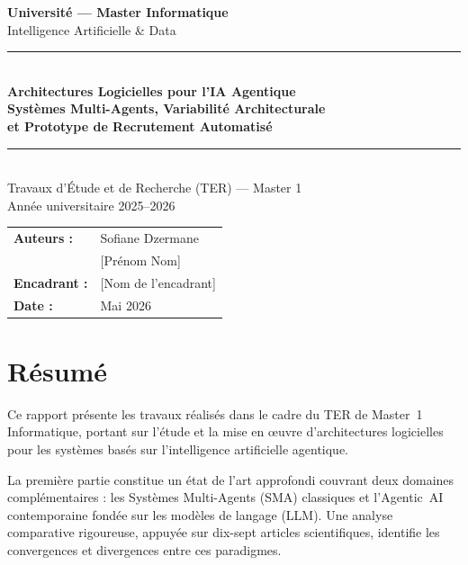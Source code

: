 \documentclass[12pt,a4paper]{report}
\begin{document}
\begin{titlepage}
\begin{center}
\vspace*{1cm}
{\Large\bfseries Université --- Master Informatique}\\[0.3em]
{\large Intelligence Artificielle \& Data}\\[0.5em]
\rule{\textwidth}{1.5pt}\\[1.5em]
{\LARGE\bfseries\color{primary}
Architectures Logicielles pour l'IA Agentique\\[0.5em]}
{\large\bfseries Systèmes Multi-Agents, Variabilité Architecturale\\
et Prototype de Recrutement Automatisé}\\[0.5em]
\rule{\textwidth}{1.5pt}\\[1.5em]
{\large Travaux d'Étude et de Recherche (TER) --- Master 1}\\[0.4em]
{\large Année universitaire 2025--2026}\\[2cm]
\begin{tabular}{ll}
\textbf{Auteurs :} & Sofiane Dzermane\\
& [Prénom Nom]\\[1em]
\textbf{Encadrant :} & [Nom de l'encadrant]\\[1em]
\textbf{Date :} & Mai 2026\\
\end{tabular}
\end{center}
\end{titlepage}

\chapter*{Résumé}

Ce rapport présente les travaux réalisés dans le cadre du TER de Master~1
Informatique, portant sur l'étude et la mise en \oe uvre d'architectures logicielles
pour les systèmes basés sur l'intelligence artificielle agentique.

La première partie constitue un état de l'art approfondi couvrant deux domaines
complémentaires : les Systèmes Multi-Agents (SMA) classiques et l'Agentic~AI
contemporaine fondée sur les modèles de langage (LLM). Une analyse comparative
rigoureuse, appuyée sur dix-sept articles scientifiques, identifie les convergences
et divergences entre ces paradigmes.
\end{document}
